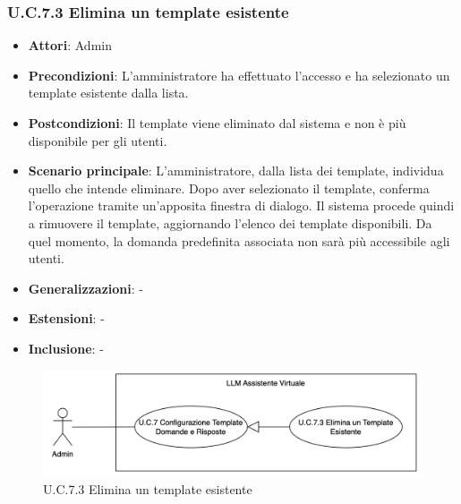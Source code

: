 \subsubsection{U.C.7.3 Elimina un template esistente}
\begin{itemize}
    \item \textbf{Attori}: Admin
    \item \textbf{Precondizioni}: L'amministratore ha effettuato l'accesso e ha selezionato un template esistente dalla lista.
    \item \textbf{Postcondizioni}: Il template viene eliminato dal sistema e non è più disponibile per gli utenti.
    \item \textbf{Scenario principale}: L'amministratore, dalla lista dei template, individua quello che intende eliminare. Dopo aver selezionato il template, conferma l'operazione tramite un'apposita finestra di dialogo. Il sistema procede quindi a rimuovere il template, aggiornando l'elenco dei template disponibili. Da quel momento, la domanda predefinita associata non sarà più accessibile agli utenti.
    \item \textbf{Generalizzazioni}: -
    \item \textbf{Estensioni}: -
    \item \textbf{Inclusione}: -
\end{itemize}
\begin{figure}[H]
    \centering
    \includegraphics[width=\textwidth]{img/U.C.7.3.png}
    \caption{U.C.7.3 Elimina un template esistente}
\end{figure}
\newpage

